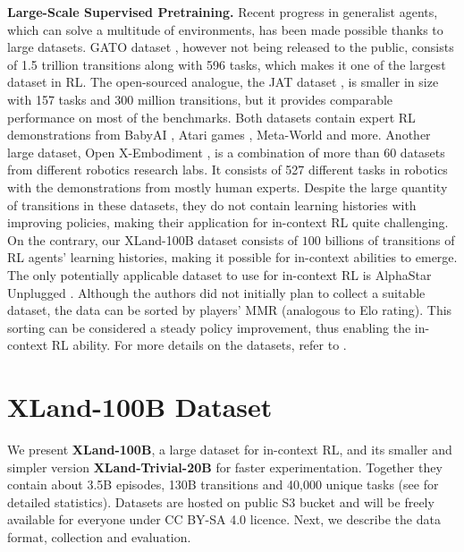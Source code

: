 \documentclass{article}
\begin{document}
\textbf{Large-Scale Supervised Pretraining.}
Recent progress in generalist agents, which can solve a multitude of environments, has been made possible thanks to large datasets. GATO dataset \citep{reed2022generalist}, however not being released to the public, consists of 1.5 trillion transitions along with 596 tasks, which makes it one of the largest dataset in RL. The open-sourced analogue, the JAT dataset \citep{gallouedec2024jack}, is smaller in size with 157 tasks and 300 million transitions, but it provides comparable performance on most of the benchmarks. Both datasets contain expert RL demonstrations from BabyAI \citep{hui2020babyai}, Atari games \citep{bellemare13arcade}, Meta-World \citep{yu2020meta} and more.
Another large dataset, Open X-Embodiment \citep{padalkar2023open}, is a combination of more than 60 datasets from different robotics research labs. It consists of 527 different tasks in robotics with the demonstrations from mostly human experts. Despite the large quantity of transitions in these datasets, they do not contain learning histories with improving policies, making their application for in-context RL quite challenging. On the contrary, our XLand-100B dataset consists of $100$ billions of transitions of RL agents' learning histories, making it possible for in-context abilities to emerge.
The only potentially applicable dataset to use for in-context RL is AlphaStar Unplugged \citep{mathieu2023alphastar}. Although the authors did not initially plan to collect a suitable dataset, the data can be sorted by players' MMR (analogous to Elo rating). This sorting can be considered a steady policy improvement, thus enabling the in-context RL ability. For more details on the datasets, refer to .
\section{XLand-100B Dataset}
\label{data}
We present \textbf{XLand-100B}, a large dataset for in-context RL, and its smaller and simpler version \textbf{XLand-Trivial-20B} for faster experimentation. Together they contain about 3.5B episodes, 130B transitions and 40,000 unique tasks (see  for detailed statistics). Datasets are hosted on public S3 bucket and will be freely available for everyone under CC BY-SA 4.0 licence. Next, we describe the data format, collection and evaluation.
\end{document}
